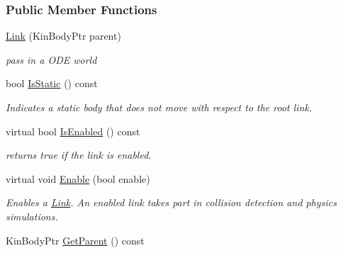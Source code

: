 \subsubsection*{Public Member Functions}
\begin{DoxyCompactItemize}
\item 
\hypertarget{classOpenRAVE_1_1KinBody_1_1Link_a8add275d6ea176d9144ec92584014b03}{
\hyperlink{classOpenRAVE_1_1KinBody_1_1Link_a8add275d6ea176d9144ec92584014b03}{Link} (KinBodyPtr parent)}
\label{classOpenRAVE_1_1KinBody_1_1Link_a8add275d6ea176d9144ec92584014b03}

\begin{DoxyCompactList}\small\item\em pass in a ODE world \item\end{DoxyCompactList}\item 
bool \hyperlink{classOpenRAVE_1_1KinBody_1_1Link_a3578d5b29398025138bfed3ef1e99558}{IsStatic} () const 
\begin{DoxyCompactList}\small\item\em Indicates a static body that does not move with respect to the root link. \item\end{DoxyCompactList}\item 
virtual bool \hyperlink{classOpenRAVE_1_1KinBody_1_1Link_ab093c91e2859f12d929fe8665e67a8e8}{IsEnabled} () const 
\begin{DoxyCompactList}\small\item\em returns true if the link is enabled. \item\end{DoxyCompactList}\item 
\hypertarget{classOpenRAVE_1_1KinBody_1_1Link_a93204280b89842474930316675ce9f07}{
virtual void \hyperlink{classOpenRAVE_1_1KinBody_1_1Link_a93204280b89842474930316675ce9f07}{Enable} (bool enable)}
\label{classOpenRAVE_1_1KinBody_1_1Link_a93204280b89842474930316675ce9f07}

\begin{DoxyCompactList}\small\item\em Enables a \hyperlink{classOpenRAVE_1_1KinBody_1_1Link}{Link}. An enabled link takes part in collision detection and physics simulations. \item\end{DoxyCompactList}\item 
\hypertarget{classOpenRAVE_1_1KinBody_1_1Link_aef334d32f92d94b51d66c428cbad2c08}{
KinBodyPtr \hyperlink{classOpenRAVE_1_1KinBody_1_1Link_aef334d32f92d94b51d66c428cbad2c08}{GetParent} () const }
\label{classOpenRAVE_1_1KinBody_1_1Link_aef334d32f92d94b51d66c428cbad2c08}


\end{DoxyCompactItemize}
